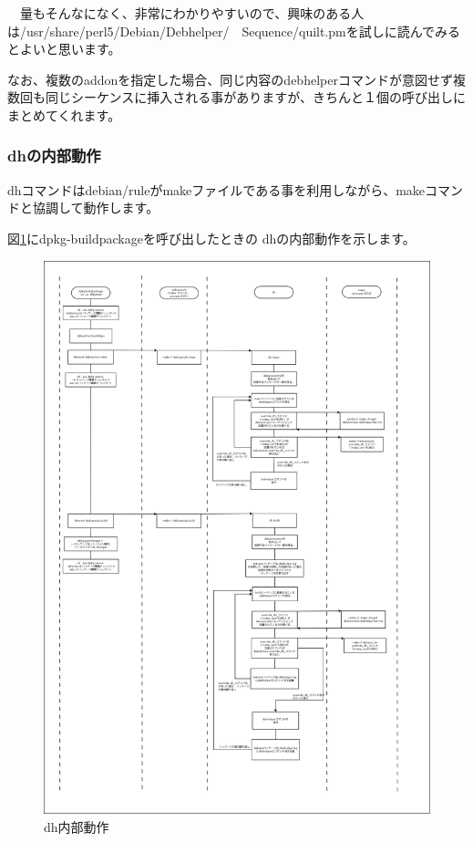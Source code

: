 \documentclass[mingoth,a4paper]{jsarticle}
\begin{document}
　量もそんなになく、非常にわかりやすいので、興味のある人は/usr/share/perl5/Debian/Debhelper/　Sequence/quilt.pmを試しに読んでみるとよいと思います。

 なお、複数のaddonを指定した場合、同じ内容のdebhelperコマンドが意図せず複数回も同じシーケンスに挿入される事がありますが、きちんと１個の呼び出しにまとめてくれます。

\subsubsection{dhの内部動作}

dhコマンドはdebian/ruleがmakeファイルである事を利用しながら、makeコマンドと協調して動作します。

図\ref{fig:dh-internal-schema1}にdpkg-buildpackageを呼び出したときの
dhの内部動作を示します。

\begin{figure}[ht]
  \begin{center}
    \includegraphics[width=17cm]{image201112/dh-internal-schema1.png}
  \end{center}
  \caption{dh内部動作}
  \label{fig:dh-internal-schema1}
\end{figure}
\end{document}
